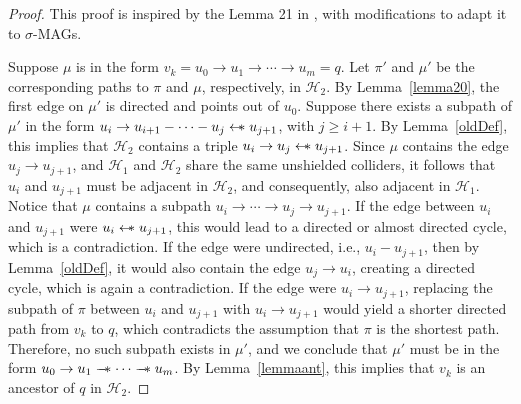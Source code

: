 \documentclass[accepted]{uai2025} %
\newcommand{\tuh}{\mathrel{\rightarrow}}
\newcommand{\hus}{\mathrel{{\leftarrow\mkern-11mu\ast}}}
\newcommand{\tus}{\mathrel{{\relbar\mkern-11mu\relbar\mkern-11mu\ast}}}
\begin{document}
\lemmatwentyone*
\begin{proof}
This proof is inspired by the Lemma 21 in \citep{spirtes1996polynomial}, with modifications to adapt it to \( \sigma \)-MAGs.

Suppose $\mu$ is in the form \( v_k = u_0 \tuh u_1 \tuh \cdots \tuh u_m = q \). Let \( \pi' \) and \( \mu' \) be the corresponding paths to \( \pi \) and \( \mu \), respectively, in \( \mathcal{H}_2 \). By Lemma~\ref{lemma20}, the first edge on \( \mu' \) is directed and points out of \( u_0 \). Suppose there exists a subpath of \( \mu' \) in the form \( u_i \rightarrow u_{i+1} - \cdots - u_j \hus u_{j+1} \), with $j\geq i + 1$. By Lemma~\ref{oldDef}, this implies that \( \mathcal{H}_2 \) contains a triple \( u_i \rightarrow u_j \hus u_{j+1} \). Since \( \mu \) contains the edge \( u_j \rightarrow u_{j+1} \), and \( \mathcal{H}_1 \) and \( \mathcal{H}_2 \) share the same unshielded colliders, it follows that \( u_i \) and \( u_{j+1} \) must be adjacent in \( \mathcal{H}_2 \), and consequently, also adjacent in \( \mathcal{H}_1 \). Notice that \( \mu \) contains a subpath \( u_i \rightarrow \cdots \rightarrow u_j \rightarrow u_{j+1} \). If the edge between \( u_i \) and \( u_{j+1} \) were \( u_i \hus  u_{j+1} \), this would lead to a directed or almost directed cycle, which is a contradiction. If the edge were undirected, i.e., \( u_i - u_{j+1} \), then by Lemma~\ref{oldDef}, it would also contain the edge \( u_j \rightarrow u_i \), creating a directed cycle, which is again a contradiction. If the edge were \( u_i \rightarrow u_{j+1} \), replacing the subpath of \( \pi \) between \( u_i \) and \( u_{j+1} \) with \( u_i \rightarrow u_{j+1} \) would yield a shorter directed path from \( v_k \) to \( q \), which contradicts the assumption that \( \pi \) is the shortest path. Therefore, no such subpath exists in \( \mu' \), and we conclude that \( \mu' \) must be in the form \( u_0 \rightarrow u_1 \tus \cdots \tus u_m \). By Lemma~\ref{lemmaant}, this implies that \( v_k \) is an ancestor of \( q \) in \( \mathcal{H}_2 \).
\end{proof}
\end{document}
